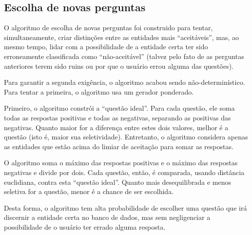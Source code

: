 \documentclass{article}
\begin{document}
\subsection{Escolha de novas perguntas}

O algoritmo de escolha de novas perguntas foi construido para tentar,
simultaneamente,
criar distinções entre as entidades mais ``aceitáveis'',
mas, ao mesmo tempo, lidar com a possibilidade de
a entidade certa ter sido erroneamente classificada como ``não-aceitável''
(talvez pelo fato de as perguntas anteriores terem sido ruins
ou por que o usuário errou alguma das questões).

Para garantir a segunda exigência, o algoritmo acabou sendo não-determinístico.
Para tentar a primeira, o algoritmo usa um gerador ponderado.

Primeiro, o algoritmo constrói a ``questão ideal''.
Para cada questão, ele soma todas as respostas positivas e todas as negativas,
separando as positivas das negativas.
Quanto maior for a diferença entre estes dois valores, melhor é a questão
(isto é, maior sua seletividade).
Entretanto, o algoritmo considera apenas as entidades que estão acima
do limiar de aceitação para somar as respostas.

O algoritmo soma o máximo das respostas positivas e o máximo das respostas negativas
e divide por dois.
Cada questão, então, é comparada, usando distância euclidiana,
contra esta ``questão ideal''.
Quanto mais desequilibrada e menos seletiva for a questão,
menor é a chance de ser escolhida.

Desta forma, o algoritmo tem alta probabilidade de escolher uma questão
que irá discernir a entidade certa no banco de dados,
mas sem negligenciar a possibilidade de o usuário ter errado alguma resposta.
\end{document}
